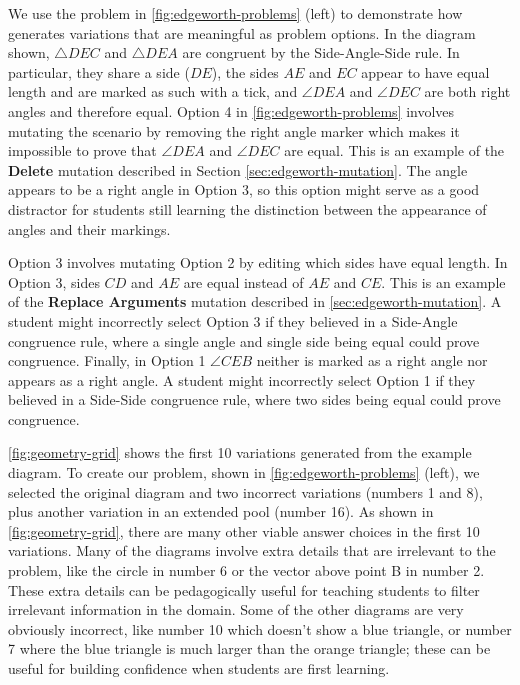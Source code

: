 We use the problem in \cref{fig:edgeworth-problems} (left) to demonstrate how \Edgeworth generates variations that are meaningful as problem options. In the diagram shown, $\triangle DEC$ and $\triangle DEA$ are congruent by the Side-Angle-Side rule. In particular, they share a side ($DE$), the sides $AE$ and $EC$ appear to have equal length and are marked as such with a tick, and $\angle DEA$ and $\angle DEC$ are both right angles and therefore equal. 
Option 4 in \cref{fig:edgeworth-problems} involves mutating the scenario by removing the right angle marker which makes it impossible to prove that $\angle DEA$ and $\angle DEC$ are equal. This is an example of the \textbf{Delete} mutation described in Section \ref{sec:edgeworth-mutation}. The angle appears to be a right angle in Option 3, so this option might serve as a good distractor for students still learning the distinction between the appearance of angles and their markings.

Option 3 involves mutating Option 2 by editing which sides have equal length. In Option 3, sides $CD$ and $AE$ are equal instead of $AE$ and $CE$. This is an example of the \textbf{Replace Arguments} mutation described in \cref{sec:edgeworth-mutation}. A student might incorrectly select Option 3 if they believed in a Side-Angle congruence rule, where a single angle and single side being equal could prove congruence. Finally, in Option 1 $\angle CEB$ neither is marked as a right angle nor appears as a right angle. A student might incorrectly select Option 1 if they believed in a Side-Side congruence rule, where two sides being equal could prove congruence.

\cref{fig:geometry-grid} shows the first 10 variations \Edgeworth generated from the example diagram. To create our problem, shown in \cref{fig:edgeworth-problems} (left), we selected the original diagram and two incorrect variations (numbers 1 and 8), plus another variation in an extended pool (number 16). As shown in \cref{fig:geometry-grid}, there are many other viable answer choices in the first 10 variations. Many of the diagrams involve extra details that are irrelevant to the problem, like the circle in number 6 or the vector above point B in number 2. These extra details can be pedagogically useful for teaching students to filter irrelevant information in the domain. Some of the other diagrams are very obviously incorrect, like number 10 which doesn't show a blue triangle, or number 7 where the blue triangle is much larger than the orange triangle; these can be useful for building confidence when students are first learning. 


